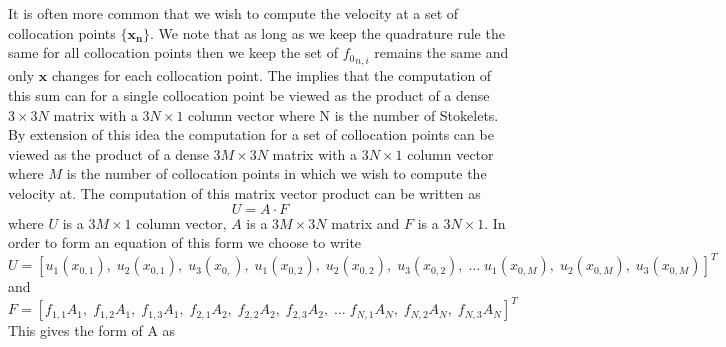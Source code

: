 It is often more common that we wish to compute the velocity at a set of collocation points $\{\mathbf{x_n}\}$. We note that as long as we keep the quadrature rule the same for all collocation points then we keep the set of ${f_0}_{n, i}$ remains the same and only $\mathbf{x}$ changes for each collocation point. The implies that the computation of this sum can for a single collocation point be viewed as the product of a dense $3 \times 3N$ matrix with a $3N \times 1$ column vector where N is the number of Stokelets. By extension of this idea the computation for a set of collocation points can be viewed as the product of a dense $3M \times 3N$ matrix with a $3N \times 1$ column vector where $M$ is the number of collocation points in which we wish to compute the velocity at.  
The computation of this matrix vector product can be written as 
\begin{equation}
\label{eq:matrixvectorproduct}
    U = A \cdot F
\end{equation}
where $U$ is a $3M \times 1$ column vector, $A$ is a $3M \times 3N$ matrix and $F$ is a $3N \times 1$. In order to form an equation of this form we choose to write 
\small
\begin{equation*}
    U = [u_1(x_{0,1}), \; u_2(x_{0,1}), \; u_3(x_{0,}), \; u_1(x_{0,2}), \; u_2(x_{0,2}), \; u_3(x_{0,2}), \; \dots \; u_1(x_{0,M}), \; u_2(x_{0,M}), \; u_3(x_{0,M})]^{T}
\end{equation*}
\normalsize
and 
\small
\begin{equation*}
    F = [f_{1,1}A_1, \; f_{1,2}A_1, \; f_{1,3}A_1, \; f_{2,1}A_2, \; f_{2,2}A_2, \; f_{2,3}A_2, \; \dots \; f_{N,1}A_N, \; f_{N,2}A_N, \; f_{N,3}A_N]^{T}
\end{equation*}
\normalsize
This gives the form of A as 
\small
